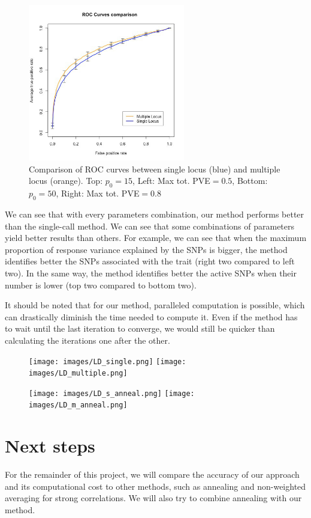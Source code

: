 \documentclass[a4paper, 11pt]{report}
\numberwithin{equation}{chapter}
\begin{document}
\begin{figure}[h!]
\includegraphics[width=2.7in, bb= 0 0 1.7in 1.7in]{images/ROC_Comp_p0_50_var_0_8.jpeg}
\caption{\label{fig:ROCComp}Comparison of ROC curves between single locus (blue) and multiple locus (orange). Top: $p_0 = 15$, Left: Max tot. PVE$ = 0.5$,
Bottom: $p_0 = 50$, Right: Max tot. PVE$ = 0.8$}
\end{figure}

We can see that with every parameters combination, our method performs better than the single-call method. We can see that some combinations of parameters yield better results than others. For example, we can see that when the maximum proportion of response variance explained by the SNPs is bigger, the method identifies better the SNPs associated with the trait (right two compared to left two). In the same way, the method identifies better the active SNPs when their number is lower (top two compared to bottom two).


It should be noted that for our method, paralleled computation is possible, which can drastically diminish the time needed to compute it. Even if the method has to wait until the last iteration to converge, we would still be quicker than calculating the iterations one after the other.
\begin{center}
\begin{figure}
\texttt{[image: images/LD\_single.png]}
\texttt{[image: images/LD\_multiple.png]}
\end{figure}
\end{center}
\begin{center}

\begin{figure}
\texttt{[image: images/LD\_s\_anneal.png]}
\texttt{[image: images/LD\_m\_anneal.png]}
\end{figure}
\end{center}
\newpage
\chapter{Next steps}
For the remainder of this project, we will compare the accuracy of our approach and its computational cost to other methods, such as annealing and non-weighted averaging for strong correlations. We will also try to combine annealing with our method.\cite{glob}
\end{document}
